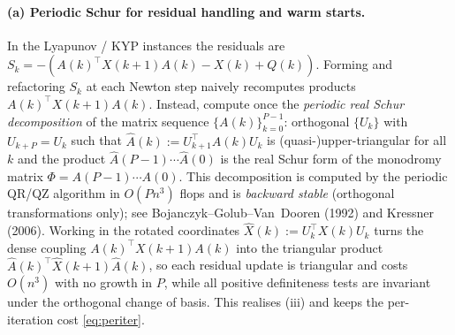 \documentclass{amsart}
\begin{document}
\paragraph{(a) Periodic Schur for residual handling and warm starts.}
In the Lyapunov / KYP instances the residuals are
$S_k=-(A(k)^{\!\top}X(k+1)A(k)-X(k)+Q(k))$. Forming and refactoring $S_k$ at each
Newton step naively recomputes products $A(k)^{\!\top}X(k+1)A(k)$. Instead, compute
once the \emph{periodic real Schur decomposition} of the matrix sequence
$\{A(k)\}_{k=0}^{P-1}$: orthogonal $\{U_k\}$ with $U_{k+P}=U_k$ such that
$\widehat A(k):=U_{k+1}^{\!\top}A(k)U_k$ is (quasi-)upper-triangular for all $k$ and
the product $\widehat A(P-1)\cdots\widehat A(0)$ is the real Schur form of the
monodromy matrix $\Phi=A(P-1)\cdots A(0)$. This decomposition is computed by the
periodic QR/QZ algorithm in $O(Pn^3)$ flops and is \emph{backward stable}
(orthogonal transformations only); see Bojanczyk--Golub--Van~Dooren (1992) and
Kressner (2006). Working in the rotated coordinates $\widehat X(k):=U_k^{\!\top}
X(k)U_k$ turns the dense coupling $A(k)^{\!\top}X(k+1)A(k)$ into the triangular
product $\widehat A(k)^{\!\top}\widehat X(k+1)\widehat A(k)$, so each residual update
is triangular and costs $O(n^3)$ with no growth in $P$, while all positive
definiteness tests are invariant under the orthogonal change of basis. This realises
(iii) and keeps the per-iteration cost \eqref{eq:periter}.
\end{document}
